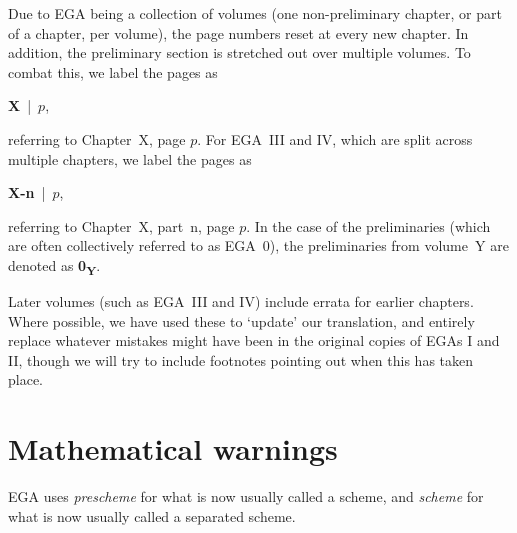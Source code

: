 Due to EGA being a collection of volumes (one non-preliminary chapter, or part of a chapter, per volume), the page numbers reset at every new chapter.
In addition, the preliminary section is stretched out over multiple volumes.
To combat this, we label the pages as
\begin{center}
  \textbf{X}~|~$p$,
\end{center}
referring to Chapter~X, page $p$.
For EGA~III and IV, which are split across multiple chapters, we label the pages as
\begin{center}
  \textbf{X-n}~|~$p$,
\end{center}
referring to Chapter~X, part~n, page $p$.
In the case of the preliminaries (which are often collectively referred to as EGA~0), the preliminaries from volume~Y are denoted as \textbf{0\textsubscript{Y}}.

\sectionbreak

Later volumes (such as EGA~III and IV) include errata for earlier chapters.
Where possible, we have used these to `update' our translation, and entirely replace whatever mistakes might have been in the original copies of EGAs I and II, though we will try to include footnotes pointing out when this has taken place.

\section*{Mathematical warnings}
EGA uses \emph{prescheme} for what is now usually called a scheme, and \emph{scheme} for what is now usually called a separated scheme.



